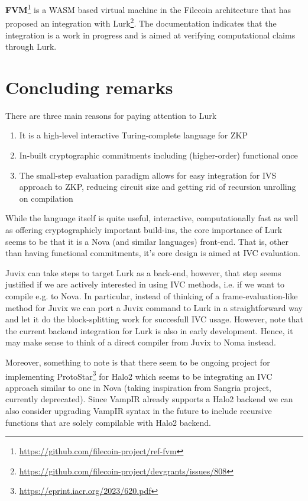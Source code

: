 \documentclass[
    9pt,            %
    techreport,        %
    affiltop,       %
]{art}
\begin{document}
\textbf{FVM}\footnote{\url{https://github.com/filecoin-project/ref-fvm}} is a WASM based virtual machine in the Filecoin architecture that has proposed an integration with Lurk\footnote{\url{https://github.com/filecoin-project/devgrants/issues/808}}. The documentation indicates that the integration is a work in progress and is aimed at verifying computational claims through Lurk.

\section{Concluding remarks}

There are three main reasons for paying attention to Lurk

\begin{enumerate}
    \item It is a high-level interactive Turing-complete language for ZKP
    \item In-built cryptographic commitments including (higher-order) functional once
    \item The small-step evaluation paradigm allows for easy integration for IVS approach to ZKP, reducing circuit size and getting rid of recursion unrolling on compilation
\end{enumerate}

While the language itself is quite useful, interactive, computationally fast as well as offering cryptographicly important build-ins, the core importance of Lurk seems to be that it is a Nova (and similar languages) front-end. That is, other than having functional commitments, it's core design is aimed at IVC evaluation. 

Juvix can take steps to target Lurk as a back-end, however, that step seems justified if we are actively interested in using IVC methods, i.e. if we want to compile e.g. to Nova. In particular, instead of thinking of a frame-evaluation-like method for Juvix we can port a Juvix command to Lurk in a straightforward way and let it do the block-splitting work for succesfull IVC usage. However, note that the current backend integration for Lurk is also in early development. Hence, it may make sense to think of a direct compiler from Juvix to Noma instead.

Moreover, something to note is that there seem to be ongoing project for implementing ProtoStar\footnote{\url{https://eprint.iacr.org/2023/620.pdf}} for Halo2 which seems to be integrating an IVC approach similar to one in Nova (taking inspiration from Sangria project, currently deprecated). Since VampIR already supports a Halo2 backend we can also consider upgrading VampIR syntax in the future to include recursive functions that are solely compilable with Halo2 backend.


\nocite{*}


\end{document}
